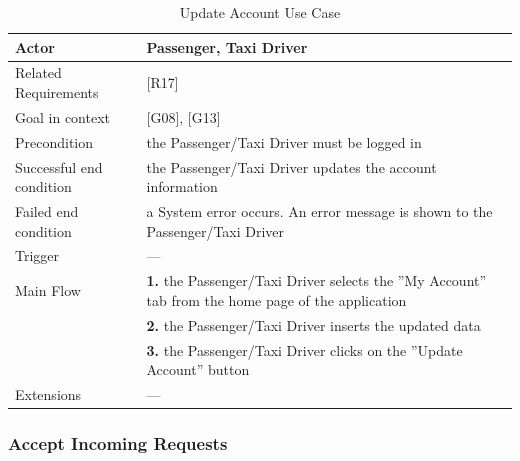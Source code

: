\begin{table}[htbp]
\begin{center}
\begin{tabular}[t]{p{}p{}}

\hline
Actor & Passenger, Taxi Driver \\
\hline
Related Requirements & [R17] \\
\hline
Goal in context & [G08], [G13] \\
\hline
Precondition & the Passenger/Taxi Driver must be logged in \\
\hline
Successful end condition & the Passenger/Taxi Driver updates the account information \\
\hline
Failed end condition & a System error occurs. An error message is shown to the Passenger/Taxi Driver  \\
\hline
Trigger & --- \\
\hline
Main Flow & \textbf{1.} the Passenger/Taxi Driver selects the ''My Account'' tab from the home page of the application \\
& \textbf{2.} the Passenger/Taxi Driver inserts the updated data \\
& \textbf{3.} the Passenger/Taxi Driver clicks on the ''Update Account'' button \\
\hline
Extensions & --- \\
\hline

\end{tabular}
\end{center}
\caption{Update Account Use Case}
\end{table}
\clearpage

\subsubsection{Accept Incoming Requests}

